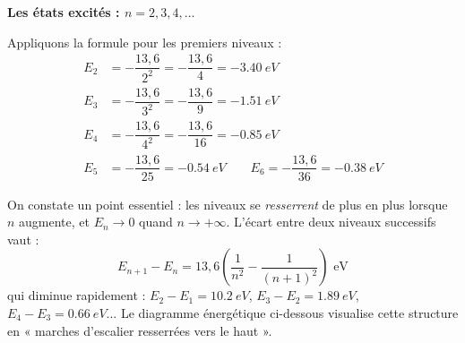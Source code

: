 \documentclass[11pt]{article}
\begin{document}
\textbf{Les états excités : $n = 2, 3, 4, \ldots$}\par

Appliquons la formule pour les premiers niveaux :
\begin{align*}
E_2 &= -\dfrac{13,6}{2^2} = -\dfrac{13,6}{4} = -\SI{3,40}{eV} \\
E_3 &= -\dfrac{13,6}{3^2} = -\dfrac{13,6}{9} = -\SI{1,51}{eV} \\
E_4 &= -\dfrac{13,6}{4^2} = -\dfrac{13,6}{16} = -\SI{0,85}{eV} \\
E_5 &= -\dfrac{13,6}{25} = -\SI{0,54}{eV} \qquad E_6 = -\dfrac{13,6}{36} = -\SI{0,38}{eV}
\end{align*}

On constate un point essentiel : les niveaux se \emph{resserrent} de plus en plus lorsque $n$ augmente, et $E_n \longrightarrow 0$ quand $n \longrightarrow +\infty$. L'écart entre deux niveaux successifs vaut :
\[
E_{n+1} - E_n = 13,6\left(\dfrac{1}{n^2} - \dfrac{1}{(n+1)^2}\right) \text{ eV}
\]
qui diminue rapidement : $E_2 - E_1 = \SI{10,2}{eV}$, $E_3 - E_2 = \SI{1,89}{eV}$, $E_4 - E_3 = \SI{0,66}{eV}$... Le diagramme énergétique ci-dessous visualise cette structure en « marches d'escalier resserrées vers le haut ».
\end{document}
